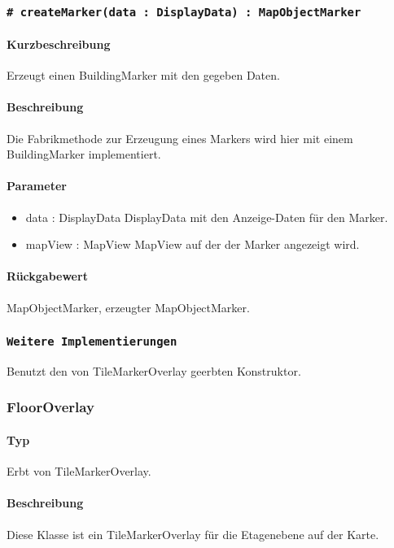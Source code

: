 \subsubsection*{\texttt{\# createMarker(data : DisplayData) : MapObjectMarker}}%
\paragraph*{Kurzbeschreibung}
Erzeugt einen BuildingMarker mit den gegeben Daten.
\paragraph*{Beschreibung}
Die Fabrikmethode zur Erzeugung eines Markers wird hier mit einem BuildingMarker implementiert.
\paragraph*{Parameter}
\begin{itemize}
    \item data : DisplayData DisplayData mit den Anzeige-Daten für den Marker.
    \item mapView : MapView MapView auf der der Marker angezeigt wird.
\end{itemize}
\paragraph*{Rückgabewert}
MapObjectMarker, erzeugter MapObjectMarker.

\subsubsection*{\texttt{Weitere Implementierungen}}%
Benutzt den von TileMarkerOverlay geerbten Konstruktor.

\subsubsection{FloorOverlay}
\paragraph*{Typ}
Erbt von TileMarkerOverlay.
\paragraph*{Beschreibung}
Diese Klasse ist ein TileMarkerOverlay für die Etagenebene auf der Karte.

